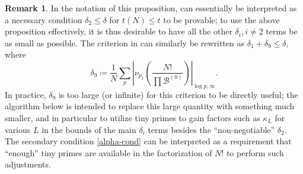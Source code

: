 \documentclass[12pt,a4paper,reqno]{amsart}
\numberwithin{equation}{section}
\theoremstyle{plain}
\theoremstyle{definition}
\newtheorem{remark}[theorem]{Remark}
\newcommand\tuple{{\mathcal B}}
\begin{document}
\begin{remark} In the notation of this proposition,  can essentially be interpreted as a necessary condition $\delta_2 \leq \delta$ for $t(N) \leq t$ to be provable; to use the above proposition effectively, it is thus desirable to have all the other $\delta_i, i \neq 2$ terms be as small as possible.  The criterion in  can similarly be rewritten as $\delta_1+\delta_9 \leq \delta$, where
  $$ \delta_9 \coloneqq \frac{1}{N} \sum_p \left|\nu_{p_1}\left( \frac{N!}{\prod \tuple^{(0)}} \right)\right|_{\log p, \infty}.$$
In practice, $\delta_9$ is too large (or infinite) for this criterion to be directly useful; the algorithm below is intended to replace this large quantity with something much smaller, and in particular to utilize tiny primes to gain factors such as $\kappa_L$ for various $L$ in the bounds of the main $\delta_i$ terms besides the ``non-negotiable'' $\delta_2$.  The secondary condition \eqref{alpha-cond} can be interpreted as a requirement that ``enough'' tiny primes are available in the factorization of $N!$ to perform such adjustments.
\end{remark}
\end{document}
